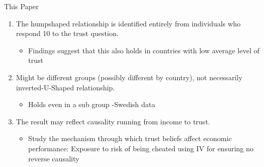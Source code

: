 \documentclass[pdftex,12pt,xcolor=pdftex,table]{beamer}
\begin{document}
\begin{frame}{This Paper}
         \begin{enumerate}
        \item The humpshaped relationship is identified entirely from individuals who respond 10 to the trust question.
            \begin{itemize}
                \item Findings suggest that this also holds in countries with low average level of trust
            \end{itemize}
        \item Might be different groups (possibly different by country), not necessarily inverted-U-Shaped relationship.
                \begin{itemize}
                    \item Holds even in a sub group -Swedish data
                \end{itemize}
       \item The result may reflect causality running from income to trust.
                \begin{itemize}
                    \item Study the mechanism through which trust beliefs affect economic performance: Exposure to risk of being cheated using IV for ensuring no reverse causality
                \end{itemize}
    \end{enumerate}
\end{frame}
\end{document}
